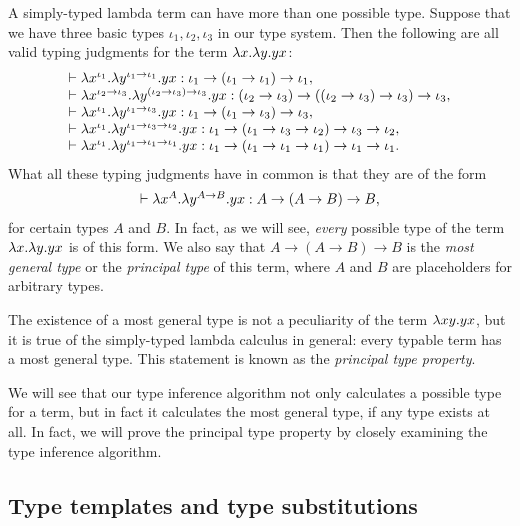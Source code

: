 \documentclass{article}
\begin{document}
A simply-typed lambda term can have more than one possible type.
Suppose that we have three basic types $\iota_1,\iota_2,\iota_3$ in
our type system. Then the following are all valid typing judgments for
the term $\lambda x.\lambda y.yx$:
\[ \begin{array}{l}
  \vdash \lambda x^{\iota_1}.\lambda y^{\iota_1\to\iota_1}.yx : 
  \iota_1\to(\iota_1\to\iota_1)\to\iota_1, \\
  \vdash \lambda x^{\iota_2\to\iota_3}.\lambda y^{(\iota_2\to\iota_3)\to\iota_3}.yx : 
  (\iota_2\to\iota_3)\to((\iota_2\to\iota_3)\to\iota_3)\to\iota_3, \\
  \vdash \lambda x^{\iota_1}.\lambda y^{\iota_1\to\iota_3}.yx : 
  \iota_1\to(\iota_1\to\iota_3)\to\iota_3, \\
  \vdash \lambda x^{\iota_1}.\lambda y^{\iota_1\to\iota_3\to\iota_2}.yx : 
  \iota_1\to(\iota_1\to\iota_3\to\iota_2)\to\iota_3\to\iota_2, \\
  \vdash \lambda x^{\iota_1}.\lambda y^{\iota_1\to\iota_1\to\iota_1}.yx : 
  \iota_1\to(\iota_1\to\iota_1\to\iota_1)\to\iota_1\to\iota_1.
\end{array}
\]
What all these typing judgments have in common is that they are of the
form
\[ \begin{array}{l}
  \vdash \lambda x^{A}.\lambda y^{A\to B}.yx : A\to(A\to B)\to B,
\end{array}
\]
for certain types $A$ and $B$. In fact, as we will see, {\em every}
possible type of the term $\lambda x.\lambda y.yx$ is of this form. We also
say that $A\to(A\to B)\to B$ is the {\em most general type} or the
{\em principal type} of this term, where $A$ and $B$ are placeholders
for arbitrary types.

The existence of a most general type is not a peculiarity of the term
$\lambda xy.yx$, but it is true of the simply-typed lambda calculus in
general: every typable term has a most general type. This statement
is known as the {\em principal type property}. 

We will see that our type inference algorithm not only calculates a
possible type for a term, but in fact it calculates the most general
type, if any type exists at all. In fact, we will prove the principal
type property by closely examining the type inference algorithm.

\subsection{Type templates and type substitutions}
\end{document}
